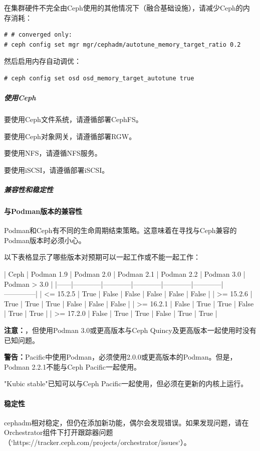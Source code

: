 \documentclass[12pt,UTF8]{ctexbook}
\begin{document}
在集群硬件不完全由Ceph使用的其他情况下（融合基础设施），请减少Ceph的内存消耗：
\begin{verbatim}
# # converged only:
# ceph config set mgr mgr/cephadm/autotune_memory_target_ratio 0.2
\end{verbatim}

然后启用内存自动调优：
\begin{verbatim}
# ceph config set osd osd_memory_target_autotune true
\end{verbatim}

\subparagraph{使用Ceph}

要使用Ceph文件系统，请遵循部署CephFS。

要使用Ceph对象网关，请遵循部署RGW。

要使用NFS，请遵循NFS服务。

要使用iSCSI，请遵循部署iSCSI。

\subparagraph{兼容性和稳定性}

\paragraph{与Podman版本的兼容性}

Podman和Ceph有不同的生命周期结束策略。这意味着在寻找与Ceph兼容的Podman版本时必须小心。

以下表格显示了哪些版本对预期可以一起工作或不能一起工作：

| Ceph | Podman 1.9 | Podman 2.0 | Podman 2.1 | Podman 2.2 | Podman 3.0 | Podman > 3.0 |
|------|------------|------------|------------|------------|------------|--------------|
| <= 15.2.5 | True | False | False | False | False | False |
| >= 15.2.6 | True | True | True | False | False | False |
| >= 16.2.1 | False | True | True | False | True | True |
| >= 17.2.0 | False | True | True | False | True | True |

\textbf{注意：}，但使用Podman 3.0或更高版本与Ceph Quincy及更高版本一起使用时没有已知问题。

\textbf{警告：} Pacific中使用Podman，必须使用2.0.0或更高版本的Podman。但是，Podman 2.2.1不能与Ceph Pacific一起使用。

"Kubic stable"已知可以与Ceph Pacific一起使用，但必须在更新的内核上运行。

\paragraph{稳定性}

cephadm相对稳定，但仍在添加新功能，偶尔会发现错误。如果发现问题，请在Orchestrator组件下打开跟踪器问题（`https://tracker.ceph.com/projects/orchestrator/issues`）。
\end{document}
